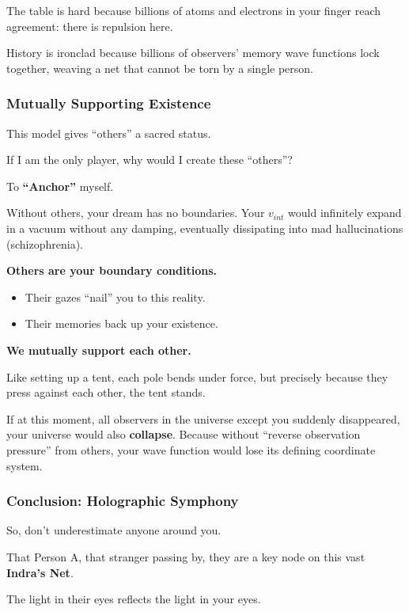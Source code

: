 The table is hard because billions of atoms and electrons in your finger reach agreement: there is repulsion here.

History is ironclad because billions of observers' memory wave functions lock together, weaving a net that cannot be torn by a single person.

\subsubsection{Mutually Supporting Existence}

This model gives ``others'' a sacred status.

If I am the only player, why would I create these ``others''?

To \textbf{``Anchor''} myself.

Without others, your dream has no boundaries. Your $v_{int}$ would infinitely expand in a vacuum without any damping, eventually dissipating into mad hallucinations (schizophrenia).

\textbf{Others are your boundary conditions.}

\begin{itemize}
\item Their gazes ``nail'' you to this reality.

\item Their memories back up your existence.
\end{itemize}

\textbf{We mutually support each other.}

Like setting up a tent, each pole bends under force, but precisely because they press against each other, the tent stands.

If at this moment, all observers in the universe except you suddenly disappeared, your universe would also \textbf{collapse}. Because without ``reverse observation pressure'' from others, your wave function would lose its defining coordinate system.

\subsubsection{Conclusion: Holographic Symphony}

So, don't underestimate anyone around you.

That Person A, that stranger passing by, they are a key node on this vast \textbf{Indra's Net}.

The light in their eyes reflects the light in your eyes.

